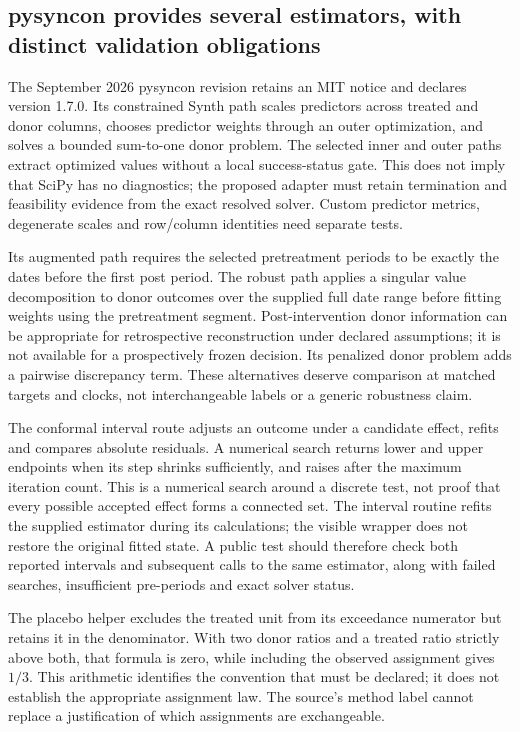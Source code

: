 \subsection{pysyncon provides several estimators, with distinct validation obligations}
The September 2026 pysyncon revision retains an MIT notice and declares
version 1.7.0. Its constrained Synth path scales predictors across treated
and donor columns, chooses predictor weights through an outer optimization,
and solves a bounded sum-to-one donor problem. The selected inner and outer
paths extract optimized values without a local success-status gate. This
does not imply that SciPy has no diagnostics; the proposed adapter must
retain termination and feasibility evidence from the exact resolved solver.
Custom predictor metrics, degenerate scales and row/column identities need
separate tests.~\citep{exec25_synthpy_pysyncon}

Its augmented path requires the selected pretreatment periods to be exactly
the dates before the first post period. The robust path applies a singular
value decomposition to donor outcomes over the supplied full date range
before fitting weights using the pretreatment segment. Post-intervention
donor information can be appropriate for retrospective reconstruction under
declared assumptions; it is not available for a prospectively frozen
decision. Its penalized donor problem adds a pairwise discrepancy term.
These alternatives deserve comparison at matched targets and clocks, not
interchangeable labels or a generic robustness claim.
\citep{exec25_synthpy_pysyncon,exec25_synthpy_choice}

The conformal interval route adjusts an outcome under a candidate effect,
refits and compares absolute residuals. A numerical search returns lower
and upper endpoints when its step shrinks sufficiently, and raises after
the maximum iteration count. This is a numerical search around a discrete
test, not proof that every possible accepted effect forms a connected set.
The interval routine refits the supplied estimator during its calculations;
the visible wrapper does not restore the original fitted state. A public
test should therefore check both reported intervals and subsequent calls
to the same estimator, along with failed searches, insufficient pre-periods
and exact solver status.~\citep{exec25_synthpy_pysyncon}

The placebo helper excludes the treated unit from its exceedance numerator
but retains it in the denominator. With two donor ratios and a treated
ratio strictly above both, that formula is zero, while including the
observed assignment gives $1/3$. This arithmetic identifies the convention
that must be declared; it does not establish the appropriate assignment
law. The source's method label cannot replace a justification of which
assignments are exchangeable.~\citep{exec25_synthpy_pysyncon,
exec25_synthpy_choice}

